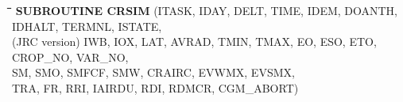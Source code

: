 \documentclass[11pt]{article}
\begin{document}
\bigskip
\bigskip
\bigskip
\nwln
\begin{tabbing}
\hspace{1.27cm}\=\hspace{1.27cm}\=\hspace{1.27cm}\=\hspace{1.27cm}\=%
\hspace{1.27cm}\=\hspace{1.27cm}\=\hspace{1.27cm}\=\hspace{1.27cm}\=%
\hspace{1.27cm}\=\hspace{1.27cm}\=\kill
{\bf SUBROUTINE CRSIM}\> \> \> (ITASK, IDAY, DELT, TIME, IDEM, DOANTH, IDHALT, TERMNL, ISTATE,\\
(JRC version) \> \> \>  IWB, IOX, LAT, AVRAD, TMIN, TMAX, EO, ESO, ETO, CROP\_NO, VAR\_NO,\\
\>\> \>  SM, SMO, SMFCF, SMW, CRAIRC, EVWMX, EVSMX,\\
 \>\> \>  TRA, FR, RRI, IAIRDU, RDI, RDMCR, CGM\_ABORT)
\end{tabbing}
\end{document}
